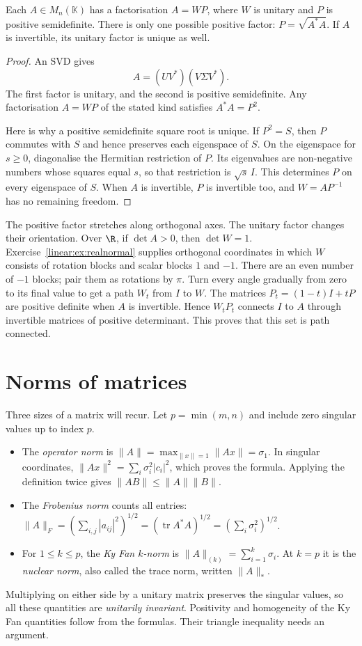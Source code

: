 \begin{theorem}\label{linear:thm:polar}
Each $A\in M_n(\mathbb K)$ has a factorisation $A=WP$, where $W$ is unitary and $P$ is positive semidefinite. There is only one possible positive factor: $P=\sqrt{A^*A}$. If $A$ is invertible, its unitary factor is unique as well.
\end{theorem}
\begin{proof}
An SVD gives
\[
A=(UV^*)(V\Sigma V^*).
\]
The first factor is unitary, and the second is positive semidefinite. Any factorisation $A=WP$ of the stated kind satisfies $A^*A=P^2$.

Here is why a positive semidefinite square root is unique. If $P^2=S$, then $P$ commutes with $S$ and hence preserves each eigenspace of $S$. On the eigenspace for $s\ge0$, diagonalise the Hermitian restriction of $P$. Its eigenvalues are non-negative numbers whose squares equal $s$, so that restriction is $\sqrt{s}\,I$. This determines $P$ on every eigenspace of $S$. When $A$ is invertible, $P$ is invertible too, and $W=AP^{-1}$ has no remaining freedom.
\end{proof}

The positive factor stretches along orthogonal axes. The unitary factor changes their orientation. Over $\R$, if $\det A>0$, then $\det W=1$. Exercise~\ref{linear:ex:realnormal} supplies orthogonal coordinates in which $W$ consists of rotation blocks and scalar blocks $1$ and $-1$. There are an even number of $-1$ blocks; pair them as rotations by $\pi$. Turn every angle gradually from zero to its final value to get a path $W_t$ from $I$ to $W$. The matrices $P_t=(1-t)I+tP$ are positive definite when $A$ is invertible. Hence $W_tP_t$ connects $I$ to $A$ through invertible matrices of positive determinant. This proves that this set is path connected.

\section{Norms of matrices}

Three sizes of a matrix will recur. Let $p=\min(m,n)$ and include zero singular values up to index $p$.
\begin{itemize}
\item The \emph{operator norm} is $\|A\|=\max_{\|x\|=1}\|Ax\|=\sigma_1$. In singular coordinates, $\|Ax\|^2=\sum_i\sigma_i^2|c_i|^2$, which proves the formula. Applying the definition twice gives $\|AB\|\le\|A\|\|B\|$.
\item The \emph{Frobenius norm} counts all entries:
$\|A\|_F=(\sum_{i,j}|a_{ij}|^2)^{1/2}=(\operatorname{tr}A^*A)^{1/2}=(\sum_i\sigma_i^2)^{1/2}$.
\item For $1\le k\le p$, the \emph{Ky Fan $k$-norm} is $\|A\|_{(k)}=\sum_{i=1}^k\sigma_i$. At $k=p$ it is the \emph{nuclear norm}, also called the trace norm, written $\|A\|_*$.
\end{itemize}
Multiplying on either side by a unitary matrix preserves the singular values, so all these quantities are \emph{unitarily invariant}. Positivity and homogeneity of the Ky Fan quantities follow from the formulas. Their triangle inequality needs an argument.

